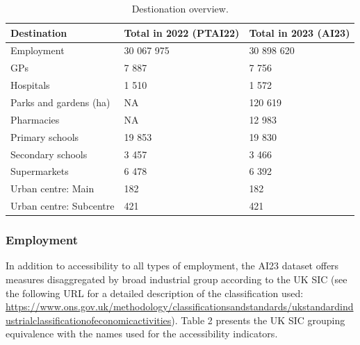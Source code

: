 \documentclass{article}
\begin{document}
\begin{table}[!h]

\caption{\label{tab:unnamed-chunk-2}Destionation overview.}
\centering
\begin{tabu} to 
\toprule
Destination & Total in 2022
(PTAI22) & Total in 2023
(AI23)\\
\midrule
Employment & 30 067 975 & 30 898 620\\
GPs & 7 887 & 7 756\\
Hospitals & 1 510 & 1 572\\
Parks and gardens (ha) & NA & 120 619\\
Pharmacies & NA & 12 983\\
\addlinespace
Primary schools & 19 853 & 19 830\\
Secondary schools & 3 457 & 3 466\\
Supermarkets & 6 478 & 6 392\\
Urban centre: Main & 182 & 182\\
Urban centre: Subcentre & 421 & 421\\
\bottomrule
\end{tabu}
\end{table}

\hypertarget{employment}{%
\subsubsection{Employment}\label{employment}}

In addition to accessibility to all types of employment, the AI23
dataset offers measures disaggregated by broad industrial group
according to the UK SIC (see the following URL for a detailed
description of the classification used:
\url{https://www.ons.gov.uk/methodology/classificationsandstandards/ukstandardindustrialclassificationofeconomicactivities}).
Table 2 presents the UK SIC grouping equivalence with the names used for
the accessibility indicators.
\end{document}
